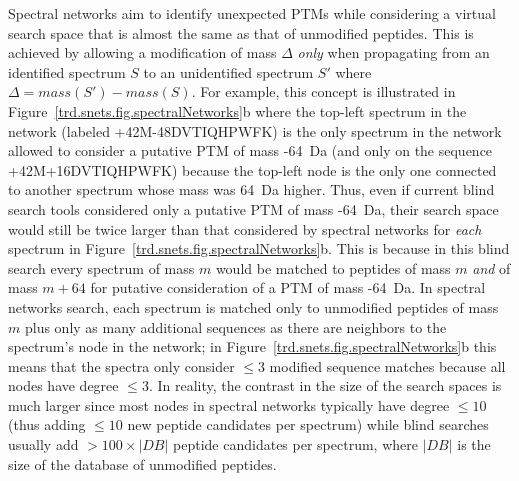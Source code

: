 \documentclass[arial,11pt]{article}
\begin{document}
Spectral networks aim to identify unexpected PTMs while considering a virtual search space that is almost the same as that of unmodified peptides. This is achieved by allowing a modification of mass $\Delta$ {\em only} when propagating from an identified spectrum $S$ to an unidentified spectrum $S'$ where $\Delta=mass(S')-mass(S)$. For example, this concept is illustrated in Figure~\ref{trd.snets.fig.spectralNetworks}b where the top-left spectrum in the network (labeled +42M-48DVTIQHPWFK) is the only spectrum in the network allowed to consider a putative PTM of mass -64~Da (and only on the sequence +42M+16DVTIQHPWFK) because the top-left node is the only one connected to another spectrum whose mass was 64~Da higher. Thus, even if current blind search tools considered only a putative PTM of mass -64~Da, their search space would still be twice larger than that considered by spectral networks for {\em each} spectrum in Figure~\ref{trd.snets.fig.spectralNetworks}b. This is because in this blind search every spectrum of mass $m$ would be matched to peptides of mass $m$ {\em and} of mass $m+64$ for putative consideration of a PTM of mass -64~Da. In spectral networks search, each spectrum is matched only to unmodified peptides of mass $m$ plus only as many additional sequences as there are neighbors to the spectrum's node in the network; in Figure~\ref{trd.snets.fig.spectralNetworks}b this means that the spectra only consider $\leq 3$ modified sequence matches because all nodes have degree $\leq 3$. In reality, the contrast in the size of the search spaces is much larger since most nodes in spectral networks typically have degree $\leq 10$ (thus adding $\leq 10$ new peptide candidates per spectrum) while blind searches usually add $>100\times |DB|$ peptide candidates per spectrum, where $|DB|$ is the size of the database of unmodified peptides.

\end{document}

